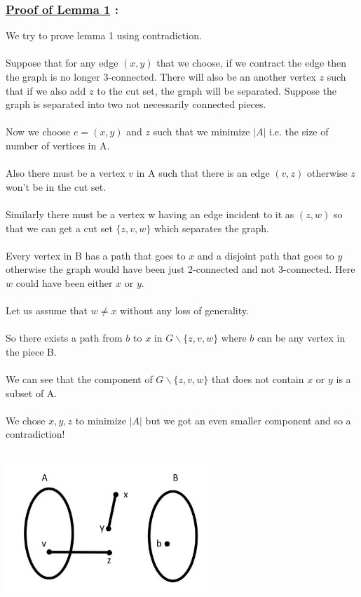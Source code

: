 \documentclass{article}
\begin{document}
    \subsubsection*{\underline{\textbf{Proof of Lemma 1}} :}
    We try to prove lemma 1 using contradiction.
    \\\\
    Suppose that for any edge $(x,y)$ that we choose, if we contract the edge then the graph is no longer 3-connected. There will also be an another vertex $z$ such that if we also add $z$ to the cut set, the graph will be separated. Suppose the graph is separated into two not necessarily connected pieces.
    \\\\
    Now we choose $e = (x,y)$ and $z$ such that we minimize $|A|$ i.e. the size of number of vertices in A.
    \\\\
    Also there must be a vertex $v$ in A such that there is an edge $(v,z)$ otherwise $z$ won't be in the cut set.
    \\\\
    Similarly there must be a vertex w having an edge incident to it as $(z,w)$ so that we can get a cut set $ \{z,v,w\} $ which separates the graph.
    \\\\
    Every vertex in B has a path that goes to $x$ and a disjoint path that goes to $y$ otherwise the graph would have been just 2-connected and not 3-connected. Here $w$ could have been either $x$ or $y$.  
    \\\\
    Let us assume that $w \neq x$ without any loss of generality.
    \\\\
    So there exists a path from $b$ to $x$ in $G \backslash \{ z,v,w \}$ where $b$ can be any vertex in the piece B.
    \\\\
    We can see that the component of $G \backslash \{ z,v,w \}$ that does not contain $x$ or $y$ is a subset of A.
    \\\\
    We chose $x,y,z$ to minimize $|A|$ but we got an even smaller component and so a contradiction!
    \\\\
    \centerline{\includegraphics[width=3in]{Images/lemma1.jpg}} 
    \\\\
    
\end{document}
